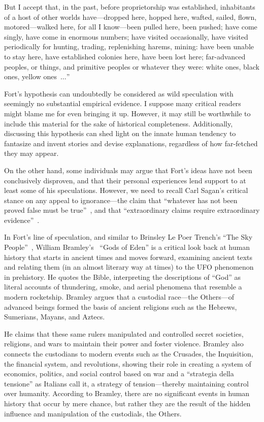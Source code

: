 \begin{svgraybox}
But I accept that, in the past, before proprietorship was established,
inhabitants of a host of other worlds have---dropped here, hopped here,
wafted, sailed, flown, motored---walked here, for all I know---been pulled here, been pushed;
have come singly, have come in enormous numbers; have visited occasionally,
 have visited periodically for hunting, trading, replenishing harems, mining:
have been unable to stay here, have established colonies here, have been lost here;
far-advanced peoples, or things, and primitive peoples or whatever they were:
white ones, black ones, yellow ones~$\ldots$''
\end{svgraybox}

Fort's hypothesis can undoubtedly be considered as wild speculation with seemingly no substantial empirical evidence.
I suppose many critical readers might blame me for even bringing it up.
However, it may still be worthwhile to include this material for the sake of historical completeness.
Additionally, discussing this hypothesis can shed light on the innate human tendency to fantasize and invent stories and devise explanations,
regardless of how far-fetched they may appear.

On the other hand, some individuals may argue that Fort's ideas have not been conclusively disproven, and that their personal experiences lend support to at least some of his speculations.
However, we need to recall Carl Sagan's critical stance on any appeal to ignorance---the claim that
``whatever has not been proved false must be true''~\cite{Sagan1997Feb},
and that ``extraordinary claims require extraordinary evidence''~\cite{Laplace1814,Flournoy1900,Russell1952}.

In Fort's line of speculation, and similar to Brinsley Le Poer Trench's
``The Sky People''~\cite{lePoerTrench1961Jan},
William Bramley's~\cite{Bramley1993Mar}  ``Gods of Eden''
is a critical look back at human history that starts in ancient
times and moves forward, examining ancient texts and relating them (in an almost literary way at times) to the UFO phenomenon in prehistory.
He quotes the Bible, interpreting the descriptions of ``God'' as literal accounts of thundering,
smoke, and aerial phenomena that resemble a modern rocketship.
Bramley argues that a custodial race---the Others---of advanced beings formed the basis of ancient religions such as the
Hebrews, Sumerians, Mayans, and Aztecs.

He claims that these same rulers manipulated and controlled secret societies,
religions, and wars to maintain their power and foster violence.
Bramley also connects the custodians to modern events such as the Crusades,
the Inquisition, the financial system, and revolutions, showing their role in creating a system of economics, politics,
and social control based on war and a ``strategia della tensione''
as Italians call it, a strategy of tension---thereby maintaining control over humanity.
According to Bramley, there are no significant events in human history that occur by mere chance,
but rather they are the result of the hidden influence and manipulation of the custodials, the Others.


